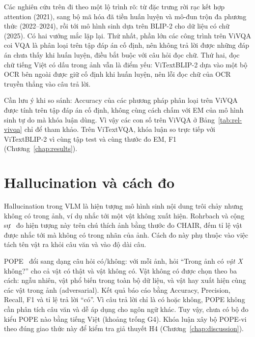 Các nghiên cứu trên đi theo một lộ trình rõ: từ đặc trưng rời rạc kết hợp
attention (2021), sang bộ mã hóa đã tiền huấn luyện và mô-đun trộn đa phương thức
(2022--2024), rồi tới mô hình sinh dựa trên BLIP-2 cho dữ liệu có chữ (2025). Có
hai vướng mắc lặp lại. Thứ nhất, phần lớn các công trình trên ViVQA coi VQA là
phân loại trên tập đáp án cố định, nên không trả lời được những đáp án chưa thấy
khi huấn luyện, điều bắt buộc với câu hỏi đọc chữ. Thứ hai, đọc chữ tiếng Việt có
dấu trong ảnh vẫn là điểm yếu: ViTextBLIP-2 dựa vào một bộ OCR bên ngoài được giữ
cố định khi huấn luyện, nên lỗi đọc chữ của OCR truyền thẳng vào câu trả lời.

Cần lưu ý khi so sánh: Accuracy của các phương pháp phân loại trên ViVQA được tính
trên tập đáp án cố định, không cùng cách chấm với EM của mô hình sinh tự do mà
khóa luận dùng. Vì vậy các con số trên ViVQA ở Bảng~\ref{tab:rel-vivqa} chỉ để
tham khảo. Trên ViTextVQA, khóa luận so trực tiếp với ViTextBLIP-2 vì cùng tập
test và cùng thước đo EM, F1 (Chương~\ref{chap:results}).

\section{Hallucination và cách đo}
\label{sec:rel-halluc}

Hallucination trong VLM là hiện tượng mô hình sinh nội dung trôi chảy nhưng không
có trong ảnh, ví dụ nhắc tới một vật không xuất hiện. Rohrbach và cộng sự~\cite{rohrbach2018chair}
đo hiện tượng này trên chú thích ảnh bằng thước đo CHAIR, đếm tỉ lệ vật được nhắc
tới mà không có trong nhãn của ảnh. Cách đo này phụ thuộc vào việc tách tên vật ra
khỏi câu văn và vào độ dài câu.

POPE~\cite{li2023pope} đổi sang dạng câu hỏi có/không: với mỗi ảnh, hỏi ``Trong
ảnh có \emph{vật X} không?'' cho cả vật có thật và vật không có. Vật không có được
chọn theo ba cách: ngẫu nhiên, vật phổ biến trong toàn bộ dữ liệu, và vật hay xuất
hiện cùng các vật trong ảnh (adversarial). Kết quả báo cáo bằng Accuracy,
Precision, Recall, F1 và tỉ lệ trả lời ``có''. Vì câu trả lời chỉ là có hoặc
không, POPE không cần phân tích câu văn và dễ áp dụng cho ngôn ngữ khác. Tuy vậy,
chưa có bộ đo kiểu POPE nào bằng tiếng Việt (khoảng trống G4). Khóa luận xây bộ
POPE-vi theo đúng giao thức này để kiểm tra giả thuyết H4
(Chương~\ref{chap:discussion}).

